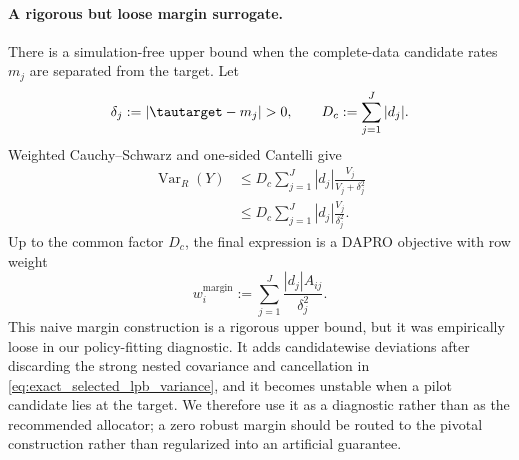 \paragraph{A rigorous but loose margin surrogate.}
There is a simulation-free upper bound when the complete-data candidate rates
$m_j$ are separated from the target.  Let
\begin{equation}
    \delta_j:=|\tautarget-m_j|>0,
    \qquad
    D_c:=\sum_{j=1}^J|d_j|.
\end{equation}
Weighted Cauchy--Schwarz and one-sided Cantelli give
\begin{equation}
\begin{split}
    \operatorname{Var}_R(Y)
    &\leq D_c\sum_{j=1}^J|d_j|
      \frac{V_j}{V_j+\delta_j^2}\\
    &\leq D_c\sum_{j=1}^J|d_j|
      \frac{V_j}{\delta_j^2}.
    \label{eq:lpb_margin_variance_bound}
\end{split}
\end{equation}
Up to the common factor $D_c$, the final expression is a DAPRO objective with
row weight
\begin{equation}
    w_i^{\mathrm{margin}}
    :=\sum_{j=1}^J
      \frac{|d_j|A_{ij}}{\delta_j^2}.
    \label{eq:lpb_margin_weight}
\end{equation}
This naive margin construction is a rigorous upper bound, but it was
empirically loose in our policy-fitting diagnostic.  It adds candidatewise
deviations after discarding the strong nested covariance and cancellation in
\eqref{eq:exact_selected_lpb_variance}, and it becomes unstable when a pilot
candidate lies at the target.  We therefore use it as a diagnostic rather
than as the recommended allocator; a zero robust margin should be routed to
the pivotal construction rather than regularized into an artificial
guarantee.

